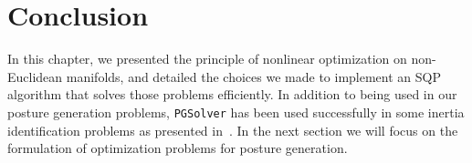 \section{Conclusion}
\label{sec:conclusion}

In this chapter, we presented the principle of nonlinear optimization on non-Euclidean manifolds, and detailed the choices we made to implement an SQP algorithm that solves those problems efficiently.
In addition to being used in our posture generation problems, {\tt PGSolver} has been used successfully in some inertia identification problems as presented in~\cite{traversaro:iros:2016}.
In the next section we will focus on the formulation of optimization problems for posture generation.


